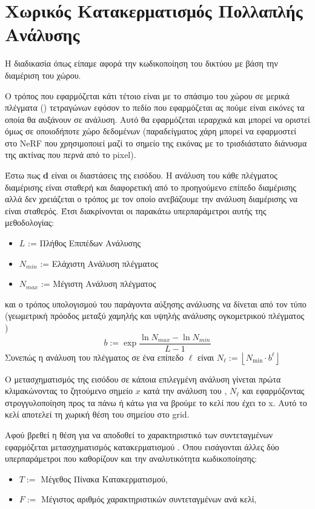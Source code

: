 \section{Χωρικός Κατακερματισμός Πολλαπλής Ανάλυσης}
\label{section4:NeuralHashGridEncoding}
\par
    Η διαδικασία  όπως είπαμε αφορά την κωδικοποίηση του δικτύου με βάση την διαμέριση του χώρου.
\par 
    Ο τρόπος που εφαρμόζεται κάτι τέτοιο είναι με το σπάσιμο του χώρου σε μερικά πλέγματα () τετραγώνων εφόσον το πεδίο που εφαρμόζεται ας πούμε είναι εικόνες τα οποία θα αυξάνουν σε ανάλυση. Αυτό θα εφαρμόζεται ιεραρχικά και μπορεί να οριστεί όμως σε οποιοδήποτε χώρο δεδομένων (παραδείγματος χάρη μπορεί να εφαρμοστεί στο NeRF που χρησιμοποιεί μαζί το σημείο της εικόνας με το τρισδιάστατο διάνυσμα της ακτίνας που περνά από το pixel).
\par
    Έστω πως \textbf{d} είναι οι διαστάσεις της εισόδου. Η ανάλυση του κάθε πλέγματος διαμέρισης είναι σταθερή και διαφορετική από το προηγούμενο επίπεδο διαμέρισης αλλά δεν χρειάζεται ο τρόπος με τον οποίο ανεβάζουμε την ανάλυση διαμέρισης να είναι σταθερός. Έτσι διακρίνονται οι παρακάτω υπερπαράμετροι αυτής της μεθοδολογίας:
    \begin{itemize}
        \item  $ L $ := Πλήθος Επιπέδων Ανάλυσης 
        \item  $N_{min}$ := Ελάχιστη Ανάλυση πλέγματος
        \item  $N_{max}$ := Μέγιστη Ανάλυση πλέγματος
    \end{itemize}
    και ο τρόπος υπολογισμού του παράγοντα αύξησης ανάλυσης να δίνεται από τον τύπο (γεωμετρική πρόοδος μεταξύ χαμηλής και υψηλής ανάλυσης ογκομετρικού πλέγματος )
    \[ b := \exp{\frac{\ln{N_{max}} - \ln{N_{min}}}{L  - 1}}\]
    Συνεπώς η ανάλυση του πλέγματος σε ένα επίπεδο $\ell$ είναι $N_{\ell}:=\left\lfloor N_{\min }\cdot b^{\ell}\right\rfloor$

\par 
    Ο μετασχηματισμός της εισόδου σε κάποια επιλεγμένη ανάλυση γίνεται πρώτα κλιμακώνοντας το ζητούμενο σημείο $x$ κατά την ανάλυση του , $N_{\ell}$ και εφαρμόζοντας στρογγυλοποίηση προς τα πάνω ή κάτω για να βρούμε το κελί που έχει το x. Αυτό το κελί αποτελεί τη χωρική θέση του σημείου στο grid.

\par 
    Αφού βρεθεί η θέση για να αποδοθεί το χαρακτηριστικό των συντεταγμένων εφαρμόζεται μετασχηματισμός κατακερματισμού  . Όπου εισάγονται άλλες δύο υπερπαράμετροι που καθορίζουν και την αναλυτικότητα κωδικοποίησης:
    \begin{itemize}
        \item $T := $ Μέγεθος Πίνακα Κατακερματισμού, 
        \item $F := $ Μέγιστος αριθμός χαρακτηριστικών συντεταγμένων ανά κελί, 
    \end{itemize}

